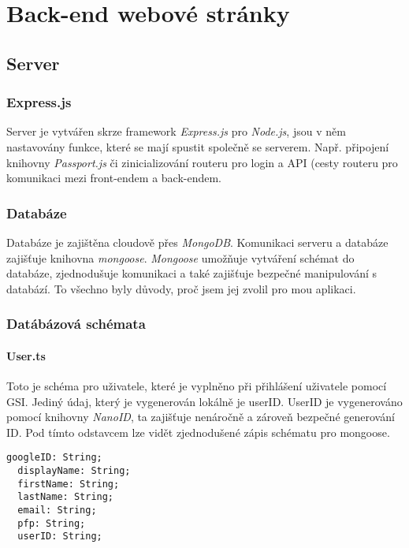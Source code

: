 \documentclass[12pt]{report}
\begin{document}
\chapter{Back-end webové stránky}

\section{Server}
\subsection{Express.js}
Server je vytvářen skrze framework \emph{Express.js} pro \emph{Node.js}, jsou v něm nastavovány funkce, které se mají spustit společně se serverem. Např. připojení knihovny \emph{Passport.js} či zinicializování routeru pro login a API (cesty routeru pro komunikaci mezi front-endem a back-endem.

\subsection{Databáze}
Databáze je zajištěna cloudově přes \emph{MongoDB}. Komunikaci serveru a databáze zajišťuje knihovna \emph{mongoose}. \emph{Mongoose} umožňuje vytváření schémat do databáze, zjednodušuje komunikaci a také zajišťuje bezpečné manipulování s databází. To všechno byly důvody, proč jsem jej zvolil pro mou aplikaci.

\subsection{Datábázová schémata}
\subsubsection{User.ts}
Toto je schéma pro uživatele, které je vyplněno při přihlášení uživatele pomocí GSI. Jediný údaj, který je vygenerován lokálně je userID. UserID je vygenerováno pomocí knihovny \emph{NanoID}, ta zajišťuje nenáročně a zároveň bezpečné generování ID. Pod tímto odstavcem lze vidět zjednodušené zápis schématu pro mongoose.
\par
\vspace{2cm}
\begin{lstlisting}[style=ES6, caption={\lbrack Kód\rbrack Schéma pro mongoose pro uživatele}]
  googleID: String;
  displayName: String;
  firstName: String;
  lastName: String;
  email: String;
  pfp: String;
  userID: String;
\end{lstlisting}
\end{document}
